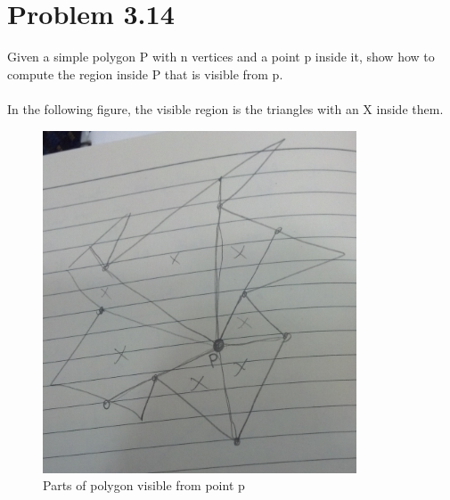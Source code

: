 \documentclass[11pt,psfig]{article}
\begin{document}
\newpage

\section*{Problem 3.14}

Given a simple polygon P with n vertices and a point p inside it, show
how to compute the region inside P that is visible from p.\\
\\
In the following figure, the visible region is the triangles with an X inside them. \\
\begin{figure}[H]
\centering
\includegraphics[height=4in]{visible_regions.jpg}
\caption{Parts of polygon visible from point p}
\end{figure}
\end{document}
